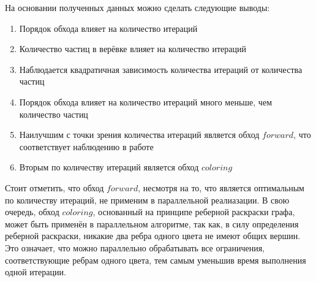 	На основании полученных данных можно сделать следующие выводы:
	\begin{enumerate}[1.]
		\item Порядок обхода влияет на количество итераций
		\item Количество частиц в верёвке влияет на количество итераций
		\item Наблюдается квадратичная зависимость количества итераций от количества частиц
		\item Порядок обхода влияет на количество итераций много меньше, чем количество частиц
		\item Наилучшим с точки зрения количества итераций является обход $forward$, что соответствует наблюдению в работе \cite{gu2017constraint}
		\item Вторым по количеству итераций является обход $coloring$
	\end{enumerate}
	
	Стоит отметить, что обход $forward$, несмотря на то, что является оптимальным по количеству итераций, не применим в параллельной реалиазации. В свою очередь, обход $coloring$, основанный на принципе реберной раскраски графа, может быть применён в параллельном алгоритме, так как, в силу определения реберной раскраски, никакие два ребра одного цвета не имеют общих вершин. Это означает, что можно параллельно обрабатывать все ограничения, соответствующие ребрам одного цвета, тем самым уменьшив время выполнения одной итерации. 

%
